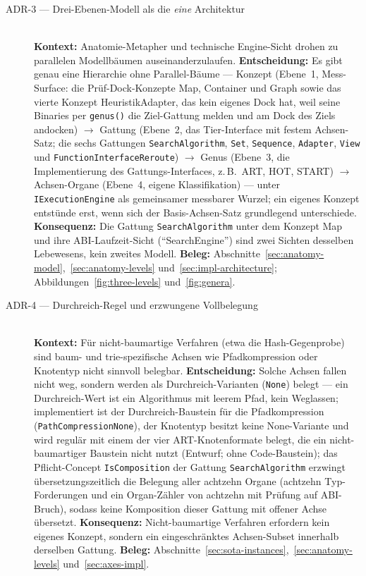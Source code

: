 \begin{description}
  \item[ADR-3 --- Drei-Ebenen-Modell als die \emph{eine} Architektur]\hfill\\
  \textbf{Kontext:} Anatomie-Metapher und technische Engine-Sicht drohen zu parallelen
  Modellbäumen auseinanderzulaufen.
  \textbf{Entscheidung:} Es gibt genau eine Hierarchie ohne Parallel-Bäume --- Konzept (Ebene~1,
  Mess-Surface: die Prüf-Dock-Konzepte Map, Container und Graph sowie das vierte Konzept
  HeuristikAdapter, das kein eigenes Dock hat, weil seine Binaries per \texttt{genus()} die Ziel-Gattung
  melden und am Dock des Ziels andocken) $\to$ Gattung (Ebene~2, das Tier-Interface mit festem
  Achsen-Satz; die sechs Gattungen \texttt{SearchAlgorithm},
  \texttt{Set}, \texttt{Sequence}, \texttt{Adapter}, \texttt{View} und
  \texttt{FunctionInterfaceReroute}) $\to$ Genus (Ebene~3, die Implementierung des
  Gattungs-Interfaces, z.\,B.\ ART, HOT, START) $\to$ Achsen-Organe (Ebene~4, eigene Klassifikation)
  --- unter \texttt{IExecutionEngine} als gemeinsamer messbarer Wurzel; ein eigenes Konzept entstünde erst, wenn sich der
  Basis-Achsen-Satz grundlegend unterschiede.
  \textbf{Konsequenz:} Die Gattung \texttt{SearchAlgorithm} unter dem Konzept Map und ihre
  ABI-Laufzeit-Sicht (\enquote{SearchEngine}) sind zwei Sichten desselben Lebewesens, kein zweites
  Modell.
  \textbf{Beleg:} Abschnitte~\ref{sec:anatomy-model},~\ref{sec:anatomy-levels}
  und~\ref{sec:impl-architecture}; Abbildungen~\ref{fig:three-levels} und~\ref{fig:genera}.

  \item[ADR-4 --- Durchreich-Regel und erzwungene Vollbelegung]\hfill\\
  \textbf{Kontext:} Für nicht-baumartige Verfahren (etwa die Hash-Gegenprobe) sind baum- und
  trie-spezifische Achsen wie Pfadkompression oder Knotentyp nicht sinnvoll belegbar.
  \textbf{Entscheidung:} Solche Achsen fallen nicht weg, sondern werden als Durchreich-Varianten
  (\texttt{None}) belegt --- ein Durchreich-Wert ist ein Algorithmus mit leerem Pfad, kein Weglassen;
  implementiert ist der Durchreich-Baustein für die Pfadkompression
  (\texttt{Path\allowbreak{}Compression\allowbreak{}None}), der Knotentyp besitzt keine None-Variante und wird
  regulär mit einem der vier ART-Knotenformate belegt, die ein nicht-baumartiger Baustein nicht nutzt
  (Entwurf; ohne Code-Baustein);
  das Pflicht-Concept \texttt{IsComposition} der Gattung \texttt{SearchAlgorithm} erzwingt
  übersetzungszeitlich die Belegung aller achtzehn Organe (achtzehn Typ-Forderungen und ein
  Organ-Zähler von achtzehn mit Prüfung auf ABI-Bruch), sodass keine Komposition dieser Gattung mit offener
  Achse übersetzt.
  \textbf{Konsequenz:} Nicht-baumartige Verfahren erfordern kein eigenes Konzept, sondern ein
  eingeschränktes Achsen-Subset innerhalb derselben Gattung.
  \textbf{Beleg:} Abschnitte~\ref{sec:sota-instances},~\ref{sec:anatomy-levels}
  und~\ref{sec:axes-impl}.


\end{description}
